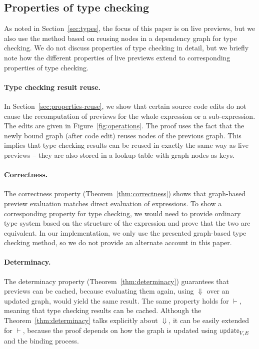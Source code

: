 \documentclass[acmsmall,anonymous,fleqn]{acmart}\settopmatter{printfolios=false,printccs=false,printacmref=false}
\theoremstyle{plain}
\theoremstyle{definition}
\newcommand{\ident}[1]{\textnormal{\textcolor{idclr}{\sffamily #1}}}
\begin{document}

\subsection{Properties of type checking}

As noted in Section~\ref{sec:types}, the focus of this paper is on live previews, but we also
use the method based on reusing nodes in a dependency graph for type checking. We do not discuss
properties of type checking in detail, but we briefly note how the different properties of
live previews extend to corresponding properties of type checking.

\paragraph{Type checking result reuse.} In Section~\ref{sec:properties-reuse}, we show that
certain source code edits do not cause the recomputation of previews for the whole expression
or a sub-expression. The edits are given in Figure~\ref{fig:operations}. The proof uses the fact
that the newly bound graph (after code edit) reuses nodes of the previous graph. This implies that
type checking results can be reused in exactly the same way as live previews -- they are also
stored in a lookup table with graph nodes as keys.

\paragraph{Correctness.} The correctness property (Theorem~\ref{thm:correctness}) shows that
graph-based preview evaluation matches direct evaluation of expressions. To show a corresponding
property for type checking, we would need to provide ordinary type system based on the structure
of the expression and prove that the two are equivalent. In our implementation, we only use the
presented graph-based type checking method, so we do not provide an alternate account in this paper.

\paragraph{Determinacy.} The determinacy property (Theorem~\ref{thm:determinacy}) guarantees that
previews can be cached, because evaluating them again, using $\Downarrow$ over an updated graph,
would yield the same result. The same property holds for $\vdash$, meaning that type checking
results can be cached. Although the Theorem~\ref{thm:determinacy} talks explicitly about
$\Downarrow$, it can be easily extended for $\vdash$, because the proof depends on how the graph
is updated using $\ident{update}_{V,E}$ and the binding process.
\end{document}
